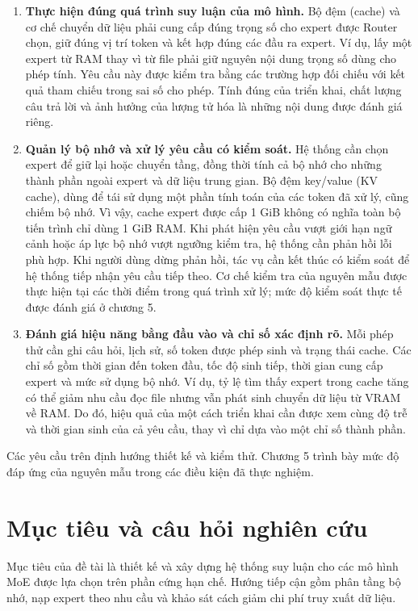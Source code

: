 \begin{enumerate}
\item \textbf{Thực hiện đúng quá trình suy luận của mô hình.} Bộ đệm (cache) và cơ chế chuyển dữ liệu phải cung cấp đúng trọng số cho expert được Router chọn, giữ đúng vị trí token và kết hợp đúng các đầu ra expert. Ví dụ, lấy một expert từ RAM thay vì từ file phải giữ nguyên nội dung trọng số dùng cho phép tính. Yêu cầu này được kiểm tra bằng các trường hợp đối chiếu với kết quả tham chiếu trong sai số cho phép. Tính đúng của triển khai, chất lượng câu trả lời và ảnh hưởng của lượng tử hóa là những nội dung được đánh giá riêng.
\item \textbf{Quản lý bộ nhớ và xử lý yêu cầu có kiểm soát.} Hệ thống cần chọn expert để giữ lại hoặc chuyển tầng, đồng thời tính cả bộ nhớ cho những thành phần ngoài expert và dữ liệu trung gian. Bộ đệm key/value (KV cache), dùng để tái sử dụng một phần tính toán của các token đã xử lý, cũng chiếm bộ nhớ. Vì vậy, cache expert được cấp 1 GiB không có nghĩa toàn bộ tiến trình chỉ dùng 1 GiB RAM. Khi phát hiện yêu cầu vượt giới hạn ngữ cảnh hoặc áp lực bộ nhớ vượt ngưỡng kiểm tra, hệ thống cần phản hồi lỗi phù hợp. Khi người dùng dừng phản hồi, tác vụ cần kết thúc có kiểm soát để hệ thống tiếp nhận yêu cầu tiếp theo. Cơ chế kiểm tra của nguyên mẫu được thực hiện tại các thời điểm trong quá trình xử lý; mức độ kiểm soát thực tế được đánh giá ở chương 5.
\item \textbf{Đánh giá hiệu năng bằng đầu vào và chỉ số xác định rõ.} Mỗi phép thử cần ghi câu hỏi, lịch sử, số token được phép sinh và trạng thái cache. Các chỉ số gồm thời gian đến token đầu, tốc độ sinh tiếp, thời gian cung cấp expert và mức sử dụng bộ nhớ. Ví dụ, tỷ lệ tìm thấy expert trong cache tăng có thể giảm nhu cầu đọc file nhưng vẫn phát sinh chuyển dữ liệu từ VRAM về RAM. Do đó, hiệu quả của một cách triển khai cần được xem cùng độ trễ và thời gian sinh của cả yêu cầu, thay vì chỉ dựa vào một chỉ số thành phần.
\end{enumerate}

Các yêu cầu trên định hướng thiết kế và kiểm thử. Chương 5 trình bày mức độ đáp ứng của nguyên mẫu trong các điều kiện đã thực nghiệm.

\section{Mục tiêu và câu hỏi nghiên cứu}

Mục tiêu của đề tài là thiết kế và xây dựng hệ thống suy luận cho các mô hình MoE được lựa chọn trên phần cứng hạn chế. Hướng tiếp cận gồm phân tầng bộ nhớ, nạp expert theo nhu cầu và khảo sát cách giảm chi phí truy xuất dữ liệu.

